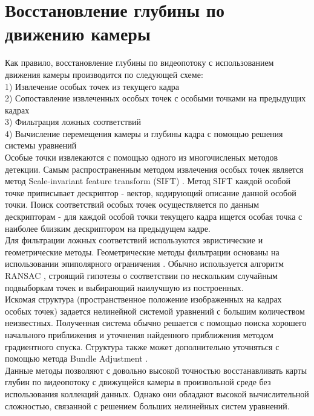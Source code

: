 \documentclass{mipt-thesis-bs}
\begin{document}
\section{Восстановление глубины по движению камеры}
Как правило, восстановление глубины по видеопотоку с использованием движения камеры производится по следующей схеме:\\
1) Извлечение особых точек из текущего кадра\\
2) Сопоставление извлеченных особых точек с особыми точками на предыдущих кадрах\\
3) Фильтрация ложных соответствий\\
4) Вычисление перемещения камеры и глубины кадра с помощью решения системы уравнений\\
Особые точки извлекаются с помощью одного из многочисленых методов детекции. Самым распространенным методом извлечения особых точек является метод Scale-invariant feature transform (SIFT) \cite{lowe1999object}. Метод SIFT каждой особой точке приписывает дескриптор - вектор, кодирующий описание данной особой точки. Поиск соответствий особых точек осуществляется по данным дескрипторам - для каждой особой точки текущего кадра ищется особая точка с наиболее близким дескриптором на предыдущем кадре.\\
Для фильтрации ложных соответствий используются эвристические и геометрические методы. Геометрические методы фильтрации основаны на использовании эпиполярного ограничения \cite{diel2005epipolar}. Обычно используется алгоритм RANSAC \cite{brachmann2017dsac}, строящий гипотезы о соответствии по нескольким случайным подвыборкам точек и выбирающий наилучшую из построенных.\\
Искомая структура (пространственное положение изображенных на кадрах особых точек) задается нелинейной системой уравнений с большим количеством неизвестных. Полученная система обычно решается с помощью поиска хорошего начального приближения и уточнения найденного приближения методом градиентного спуска. Структура также может дополнительно уточняться с помощью метода Bundle Adjustment \cite{zhang2006incremental}.\\
Данные методы позволяют с довольно высокой точностью восстанавливать карты глубин по видеопотоку с движущейся камеры в произвольной среде без использования коллекций данных. Однако они обладают высокой вычислительной сложностью, связанной с решением больших нелинейных систем уравнений.\\
\end{document}
